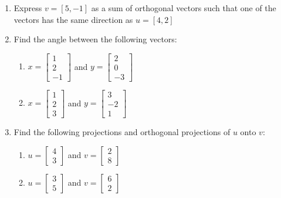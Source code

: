 \documentclass[10pt]{book}
\theoremstyle{definition}
\theoremstyle{remark}
\begin{document}
\begin{large}
\begin{enumerate}
\item Express $v = [5,-1]$ as a sum of orthogonal vectors such that one of the vectors has the same direction as $u = [4,2]$\vfil\vfil\vfil
\newpage

\item Find the angle between the following vectors:
\begin{enumerate}
\item $x = \begin{bmatrix} 1 \\ 2 \\ -1 \end{bmatrix}$ and $y=\begin{bmatrix}2 \\ 0 \\-3 \end{bmatrix}$\vfil\vfil
\item $x = \begin{bmatrix} 1 \\ 2 \\ 3 \end{bmatrix}$ and $y=\begin{bmatrix}3 \\ -2 \\1 \end{bmatrix}$\vfil
\end{enumerate}
\newpage

\item  Find the following projections and orthogonal projections of $u$ onto $v$:
\begin{enumerate}
\item $u = \begin{bmatrix} 4 \\ 3  \end{bmatrix}$ and $v=\begin{bmatrix}2 \\ 8 \end{bmatrix}$\vfil\vfil   
\item $u = \begin{bmatrix} 3 \\ 5 \end{bmatrix}$ and $v=\begin{bmatrix}6 \\2 \end{bmatrix}$ \vfil
\end{enumerate}
\newpage
\end{enumerate}
\end{large}
\newpage
\end{document}
